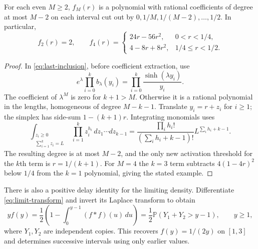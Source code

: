 \documentclass[11pt,letterpaper]{article}
\newcommand{\PP}{\mathbb P}\newcommand{\EE}{\mathbb E}
\begin{document}
\begin{corollary}\label{cor:polynomial}
For each even $M\ge2$, $f_M(r)$ is a polynomial with rational coefficients
of degree at most $M-2$ on each interval cut out by
$0,1/M,1/(M-2),\ldots,1/2$. In particular,
\[
 f_2(r)=2,\qquad
 f_4(r)=\begin{cases}
 24r-56r^2,&0<r<1/4,\\
 4-8r+8r^2,&1/4\le r<1/2.
 \end{cases}
\]
\end{corollary}
\begin{proof}
In \eqref{eq:last-inclusion}, before coefficient extraction, use
\[
 e^\lambda\prod_{i=0}^k b_\lambda(y_i)
 =\prod_{i=0}^k\frac{\sinh(\lambda y_i)}{y_i}.
\]
The coefficient of $\lambda^M$ is zero for $k+1>M$. Otherwise it is a
rational polynomial in the lengths, homogeneous of degree $M-k-1$.
Translate $y_i=r+z_i$ for $i\ge1$; the simplex has side-sum
$1-(k+1)r$. Integrating monomials uses
\[
 \int_{\substack{z_i\ge0\\ \sum_{i=1}^kz_i=L}}
       \prod_{i=1}^kz_i^{h_i}\,dz_1\cdots dz_{k-1}
 =\frac{\prod_i h_i!}{(\sum_i h_i+k-1)!}
       L^{\sum_i h_i+k-1}.
\]
The resulting degree is at most $M-2$, and the only new activation
threshold for the $k$th term is $r=1/(k+1)$. For $M=4$ the $k=3$ term
subtracts $4(1-4r)^2$ below $1/4$ from the $k=1$ polynomial, giving the
stated example.
\end{proof}

There is also a positive delay identity for the limiting density. Differentiate
\eqref{eq:limit-transform} and invert its Laplace transform to obtain
\begin{equation}\label{eq:density-delay}
 y f(y)=\frac12\left(1-\int_0^{y-1}(f*f)(u)\,du\right)
 =\frac12\PP(Y_1+Y_2>y-1),\qquad y\ge1,
\end{equation}
where $Y_1,Y_2$ are independent copies. This recovers $f(y)=1/(2y)$ on
$[1,3]$ and determines successive intervals using only earlier values.
\end{document}
